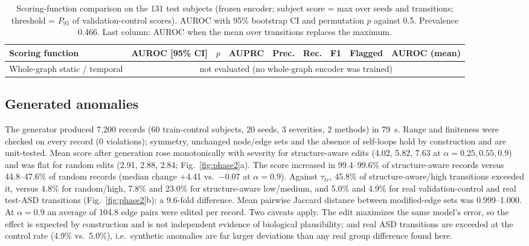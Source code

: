 \documentclass[conference]{IEEEtran}
\begin{document}
\begin{table}[!tp]
\caption{Scoring-function comparison on the 131 test subjects (frozen encoder; subject score = max over seeds and transitions; threshold = $P_{95}$ of validation-control scores). AUROC with 95\% bootstrap CI and permutation $p$ against 0.5. Prevalence 0.466. Last column: AUROC when the mean over transitions replaces the maximum.}
\label{tab:scoring}
\centering\footnotesize
\begin{tabular}{@{}lcccccccc@{}}
\toprule
Scoring function & AUROC [95\% CI] & $p$ & AUPRC & Prec. & Rec. & F1 & Flagged & AUROC (mean) \\
\midrule

Whole-graph static / temporal & \multicolumn{8}{c}{not evaluated (no whole-graph encoder was trained)} \\
\bottomrule
\end{tabular}
\end{table}

\subsection{Generated anomalies}
The generator produced 7,200 records (60 train-control subjects, 20 seeds, 3 severities, 2 methods) in 79~s. Range and finiteness were checked on every record (0 violations); symmetry, unchanged node/edge sets and the absence of self-loops hold by construction and are unit-tested. Mean score after generation rose monotonically with severity for structure-aware edits (4.02, 5.82, 7.63 at $\alpha=0.25,0.55,0.9$) and was flat for random edits (2.91, 2.88, 2.84; Fig.~\ref{fig:phase2}a). The score increased in 99.4--99.6\% of structure-aware records versus 44.8--47.6\% of random records (median change +4.41 vs.\ $-0.07$ at $\alpha=0.9$). Against $\tau_{tr}$, 45.8\% of structure-aware/high transitions exceeded it, versus 4.8\% for random/high, 7.8\% and 23.0\% for structure-aware low/medium, and 5.0\% and 4.9\% for real validation-control and real test-ASD transitions (Fig.~\ref{fig:phase2}b): a 9.6-fold difference. Mean pairwise Jaccard distance between modified-edge sets was 0.999--1.000. At $\alpha=0.9$ an average of 104.8 edge pairs were edited per record. Two caveats apply. The edit maximizes the same model's error, so the effect is expected by construction and is not independent evidence of biological plausibility; and real ASD transitions are exceeded at the control rate (4.9\% vs.\ 5.0\%), i.e.\ synthetic anomalies are far larger deviations than any real group difference found here.
\end{document}
